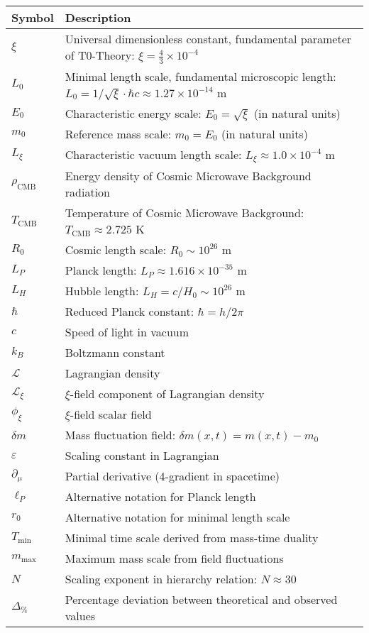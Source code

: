 \documentclass[12pt,a4paper]{article}
\numberwithin{equation}{section}
\begin{document}
	\begin{longtable}{p{2cm} p{12cm}}
		\toprule
		\textbf{Symbol} & \textbf{Description} \\
		\midrule
		\endhead
		
		$\xi$ & Universal dimensionless constant, fundamental parameter of T0-Theory: $\xi = \frac{4}{3} \times 10^{-4}$ \\
		$L_0$ & Minimal length scale, fundamental microscopic length: $L_0 = 1/\sqrt{\xi} \cdot \hbar c \approx 1.27 \times 10^{-14}$ m \\
		$E_0$ & Characteristic energy scale: $E_0 = \sqrt{\xi}$ (in natural units) \\
		$m_0$ & Reference mass scale: $m_0 = E_0$ (in natural units) \\
		$L_\xi$ & Characteristic vacuum length scale: $L_\xi \approx 1.0 \times 10^{-4}$ m \\
		$\rho_{\text{CMB}}$ & Energy density of Cosmic Microwave Background radiation \\
		$T_{\text{CMB}}$ & Temperature of Cosmic Microwave Background: $T_{\text{CMB}} \approx 2.725$ K \\
		$R_0$ & Cosmic length scale: $R_0 \sim 10^{26}$ m \\
		$L_P$ & Planck length: $L_P \approx 1.616 \times 10^{-35}$ m \\
		$L_H$ & Hubble length: $L_H = c/H_0 \sim 10^{26}$ m \\
		$\hbar$ & Reduced Planck constant: $\hbar = h/2\pi$ \\
		$c$ & Speed of light in vacuum \\
		$k_B$ & Boltzmann constant \\
		$\mathcal{L}$ & Lagrangian density \\
		$\mathcal{L}_{\xi}$ & $\xi$-field component of Lagrangian density \\
		$\phi_\xi$ & $\xi$-field scalar field \\
		$\delta m$ & Mass fluctuation field: $\delta m(x,t) = m(x,t) - m_0$ \\
		$\varepsilon$ & Scaling constant in Lagrangian \\
		$\partial_\mu$ & Partial derivative (4-gradient in spacetime) \\
		$\ell_P$ & Alternative notation for Planck length \\
		$r_0$ & Alternative notation for minimal length scale \\
		$T_{\text{min}}$ & Minimal time scale derived from mass-time duality \\
		$m_{\text{max}}$ & Maximum mass scale from field fluctuations \\
		$N$ & Scaling exponent in hierarchy relation: $N \approx 30$ \\
		$\Delta_{\%}$ & Percentage deviation between theoretical and observed values \\
		\bottomrule
	\end{longtable}
	
\end{document}

